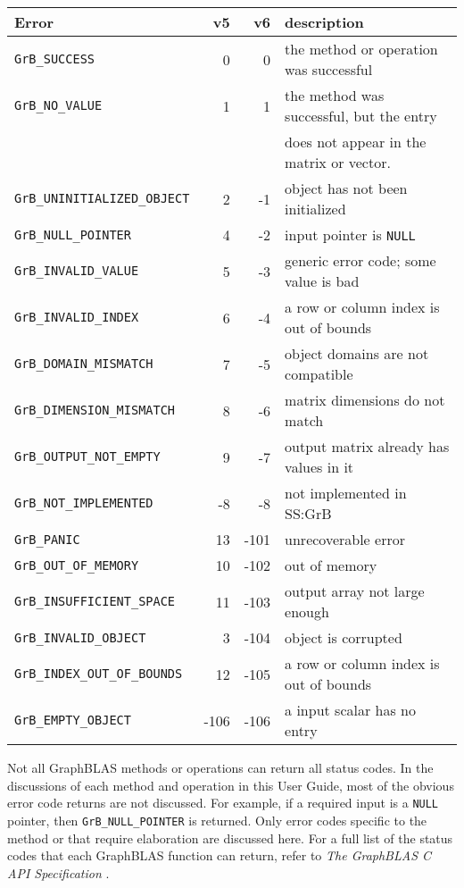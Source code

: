 \documentclass[12pt]{article}
\begin{document}
\vspace{0.2in}
\noindent
{\small
\begin{tabular}{lrrp{2.8in}}
\hline
Error                           &  v5  & v6  & description \\
\hline
\verb'GrB_SUCCESS'              &  0   & 0   & the method or operation was successful \\
\verb'GrB_NO_VALUE'             &  1   & 1   & the method was successful, but the entry \\
                                &      &     & does not appear in the matrix or vector. \\
\hline
\hline
\verb'GrB_UNINITIALIZED_OBJECT' &  2   & -1   & object has not been initialized \\
\verb'GrB_NULL_POINTER'         &  4   & -2   & input pointer is \verb'NULL' \\
\verb'GrB_INVALID_VALUE'        &  5   & -3   & generic error code; some value is bad \\
\verb'GrB_INVALID_INDEX'        &  6   & -4   & a row or column index is out of bounds \\
\verb'GrB_DOMAIN_MISMATCH'      &  7   & -5   & object domains are not compatible \\
\verb'GrB_DIMENSION_MISMATCH'   &  8   & -6   & matrix dimensions do not match \\
\verb'GrB_OUTPUT_NOT_EMPTY'     &  9   & -7   & output matrix already has values in it \\
\verb'GrB_NOT_IMPLEMENTED'      &  -8  & -8   & not implemented in SS:GrB \\
\verb'GrB_PANIC'                &  13  & -101 & unrecoverable error \\
\verb'GrB_OUT_OF_MEMORY'        &  10  & -102 & out of memory \\
\verb'GrB_INSUFFICIENT_SPACE'   &  11  & -103 & output array not large enough \\
\verb'GrB_INVALID_OBJECT'       &  3   & -104 & object is corrupted \\
\verb'GrB_INDEX_OUT_OF_BOUNDS'  &  12  & -105 & a row or column index is out of bounds \\
\verb'GrB_EMPTY_OBJECT'         & -106 & -106 & a input scalar has no entry \\
\hline
\end{tabular}
\vspace{0.2in}
}

Not all GraphBLAS methods or operations can return all status codes.
In the discussions of each method and operation in this User Guide, most of the
obvious error code returns are not discussed.  For example, if a required input
is a \verb'NULL' pointer, then \verb'GrB_NULL_POINTER' is returned.  Only error
codes specific to the method or that require elaboration are discussed here.
For a full list of the status codes that each GraphBLAS function can return,
refer to {\em The GraphBLAS C API Specification} \cite{spec}.
\end{document}
